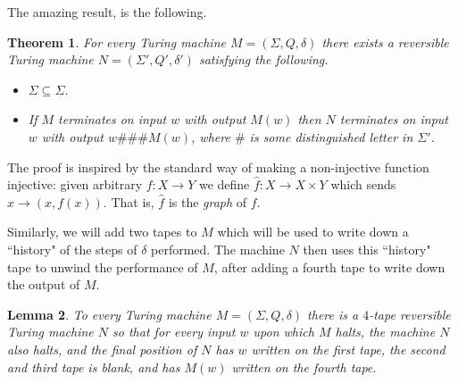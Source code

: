 \documentclass[12pt]{article}
\theoremstyle{plain}
\newtheorem{thm}{Theorem}[subsection] %
\newtheorem{lemma}[thm]{Lemma}
\theoremstyle{definition}
\newcommand{\lto}{\longrightarrow}
\begin{document}
	The amazing result, is the following.
	\begin{thm}\label{thm:reversible}
		For every Turing machine $M = (\Sigma, Q, \delta)$ there exists a reversible Turing machine $N = (\Sigma', Q', \delta')$ satisfying the following.
		\begin{itemize}
			\item $\Sigma \subseteq \Sigma$.
			\item If $M$ terminates on input $w$ with output $M(w)$ then $N$ terminates on input $w$ with output $w \# \# \# M(w)$, where $\#$ is some distinguished letter in $\Sigma'$.
		\end{itemize}
	\end{thm}
	The proof is inspired by the standard way of making a non-injective function injective: given arbitrary $f: X \lto Y$ we define $\hat{f}: X \lto X \times Y$ which sends $x \lto (x,f(x))$. That is, $\hat{f}$ is the \emph{graph} of $f$.
	
	Similarly, we will add two tapes to $M$ which will be used to write down a ``history" of the steps of $\delta$ performed. The machine $N$ then uses this ``history" tape to unwind the performance of $M$, after adding a fourth tape to write down the output of $M$. 

\begin{lemma}\label{lem:reversible_three_tapes}
	To every Turing machine $M = (\Sigma, Q, \delta)$ there is a $4$-tape reversible Turing machine $N$ so that for every input $w$ upon which $M$ halts, the machine $N$ also halts, and the final position of $N$ has $w$ written on the first tape, the second and third tape is blank, and has $M(w)$ written on the fourth tape.
\end{lemma}
\end{document}
